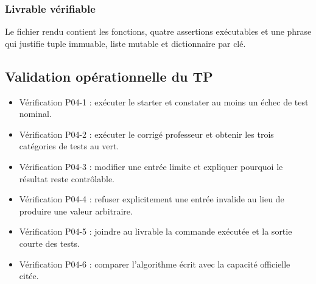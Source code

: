 \subsubsection{Livrable vérifiable}

Le fichier rendu contient les fonctions, quatre assertions exécutables
et une phrase qui justifie tuple immuable, liste mutable et dictionnaire
par clé.

\subsection{Validation opérationnelle du TP}

\begin{itemize}
\tightlist
\item
  Vérification P04-1 : exécuter le starter et constater au moins un
  échec de test nominal.
\item
  Vérification P04-2 : exécuter le corrigé professeur et obtenir les
  trois catégories de tests au vert.
\item
  Vérification P04-3 : modifier une entrée limite et expliquer pourquoi
  le résultat reste contrôlable.
\item
  Vérification P04-4 : refuser explicitement une entrée invalide au lieu
  de produire une valeur arbitraire.
\item
  Vérification P04-5 : joindre au livrable la commande exécutée et la
  sortie courte des tests.
\item
  Vérification P04-6 : comparer l'algorithme écrit avec la capacité
  officielle citée.
\end{itemize}
